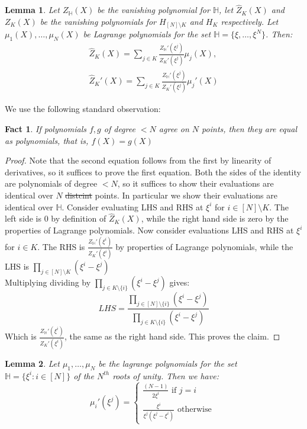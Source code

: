 \documentclass[sigconf]{acmart}
\newtheorem{lemma}{Lemma}[section]
\newcommand{\nroots}{\mathbb{H}}
\newtheorem{fact}{Fact}[section]
\providecommand{\DIFaddtex}[1]{{\protect\color{blue}\uwave{#1}}} %
\providecommand{\DIFdeltex}[1]{{\protect\color{red}\sout{#1}}}                      %
\providecommand{\DIFaddbegin}{} %
\providecommand{\DIFaddend}{} %
\providecommand{\DIFdelbegin}{} %
\providecommand{\DIFdelend}{} %
\providecommand{\DIFadd}[1]{\texorpdfstring{\DIFaddtex{#1}}{#1}} %
\providecommand{\DIFdel}[1]{\texorpdfstring{\DIFdeltex{#1}}{}} %
\newcommand{\DIFscaledelfig}{0.5}
\newlength{\DIFdelgraphicswidth} %
\newlength{\DIFdelgraphicsheight} %
\newcommand{\DIFaddincludegraphics}[2][]{{\color{blue}\fbox{\DIFOincludegraphics[#1]{#2}}}} %
\newcommand{\DIFdelincludegraphics}[2][]{%
	\sbox{\DIFdelgraphicsbox}{\DIFOincludegraphics[#1]{#2}}%
	\settoboxwidth{\DIFdelgraphicswidth}{\DIFdelgraphicsbox} %
	\settoboxtotalheight{\DIFdelgraphicsheight}{\DIFdelgraphicsbox} %
	\scalebox{\DIFscaledelfig}{%
		\parbox[b]{\DIFdelgraphicswidth}{\usebox{\DIFdelgraphicsbox}\\[-\baselineskip] \rule{\DIFdelgraphicswidth}{0em}}\llap{\resizebox{\DIFdelgraphicswidth}{\DIFdelgraphicsheight}{%
				\setlength{\unitlength}{\DIFdelgraphicswidth}%
				\begin{picture}(1,1)%
					\thicklines\linethickness{2pt} %
					{\color[rgb]{1,0,0}\put(0,0){\framebox(1,1){}}}%
					{\color[rgb]{1,0,0}\put(0,0){\line( 1,1){1}}}%
					{\color[rgb]{1,0,0}\put(0,1){\line(1,-1){1}}}%
				\end{picture}%
			}\hspace*{3pt}}} %
} %
\DeclareRobustCommand{\DIFaddbegin}{\DIFOaddbegin \let\includegraphics\DIFaddincludegraphics} %
\DeclareRobustCommand{\DIFaddend}{\DIFOaddend \let\includegraphics\DIFOincludegraphics} %
\DeclareRobustCommand{\DIFdelbegin}{\DIFOdelbegin \let\includegraphics\DIFdelincludegraphics} %
\DeclareRobustCommand{\DIFdelend}{\DIFOaddend \let\includegraphics\DIFOincludegraphics} %
\begin{document}
	\begin{lemma}\label{lem:zk-hat}
		Let $Z_\nroots(X)$ be the vanishing polynomial for $\nroots$, let $\widehat{Z}_K(X)$ and  $Z_K(X)$ be the vanishing polynomials for $H_{[N]\setminus K}$ and $H_K$ respectively.
		Let $\mu_1(X),\ldots,\mu_N(X)$ be Lagrange polynomials for the set $\nroots=\{\xi,\ldots,\xi^N\}$. Then:
		\begin{gather}
			\widehat{Z}_K(X) = \sum_{j\in K}\frac{Z_\nroots'(\xi^j)}{Z_K'(\xi^j)}\mu_j(X), \\
			\widehat{Z}_K'(X)= \sum_{j\in K}\frac{Z_\nroots'(\xi^j)}{Z_K'(\xi^j)}\mu_j'(X)
		\end{gather}
	\end{lemma}
	We use the following standard observation:
	\begin{fact}
		If polynomials $f,g$ of degree $<N$ agree on $N$ points, then they are equal as polynomials, that is, $f(X)=g(X)$
	\end{fact}
	
	\begin{proof}
		Note that the second equation follows from the first by linearity of derivatives, so it suffices to prove the first equation.
		Both the sides of the identity are polynomials of degree $<N$, so it suffices to show their evaluations are identical over $N$ \DIFdelbegin \DIFdel{distcint }\DIFdelend \DIFaddbegin \DIFadd{distinct }\DIFaddend points.
		In particular we show their evaluations are identical over $\nroots$.
		Consider evaluating LHS and RHS at $\xi^i$ for $i \in [N]\setminus K$.
		The left side is $0$ by definition of $\hat{Z}_K(X)$, while the right hand side is zero by the properties of Lagrange polynomials.
		Now consider evaluations LHS and RHS at $\xi^i$ for $i \in K$.
		The RHS is $\frac{Z_\nroots'(\xi^i)}{Z_K'(\xi^i)}$ by properties of Lagrange polynomials, while the
		LHS is $\prod_{j \in [N]\setminus K} (\xi^i-\xi^j)$\\
		Multiplying dividing by $\prod_{ j \in K \setminus \{i\}}(\xi^i-\xi^j)$ gives:
		$$LHS = \frac{\prod_{j \in [N] \setminus \{i\}} (\xi^i-\xi^j)}{\prod_{j \in K \setminus \{i\}}(\xi^i-\xi^j)}$$
		Which is $\frac{Z_\nroots'(\xi^i)}{Z_K'(\xi^i)}$, the same as the right hand side.
		This proves the claim.
	\end{proof}
	
	\begin{lemma}\label{lem:lamda-deriv}
		Let $\mu_1,\ldots,\mu_N$ be the lagrange polynomials for the set $\nroots=\{\xi^i:i\in [N]\}$
		of the $N^{th}$ roots of unity. Then we have:
		\begin{equation*}
			\mu_i'(\xi^j) = \begin{cases}
				\frac{(N-1)}{2\xi^{i}}  \text{ if } j=i\\
				\frac{\xi^i}{\xi^j(\xi^j-\xi^i)} \text{ otherwise }
			\end{cases}
		\end{equation*}
	\end{lemma}
	
\end{document}
